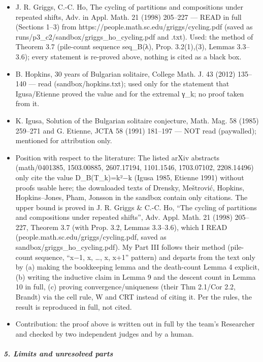\documentclass[11pt,a4paper]{article}
\providecommand{\tightlist}{\setlength{\itemsep}{0pt}\setlength{\parskip}{0pt}}
\begin{document}
\begin{itemize}
\tightlist
\item
  J. R. Griggs, C.-C. Ho, The cycling of partitions and compositions
  under repeated shifts, Adv. in Appl. Math. 21 (1998) 205--227 --- READ
  in full (Sections 1--3) from
  https://people.math.sc.edu/griggs/cycling.pdf (saved as
  runs/p3\_c2/sandbox/griggs\_ho\_cycling.pdf and .txt). Used: the
  method of Theorem 3.7 (pile-count sequence seq\_B(λ), Prop.
  3.2(1),(3), Lemmas 3.3--3.6); every statement is re-proved above,
  nothing is cited as a black box.
\item
  B. Hopkins, 30 years of Bulgarian solitaire, College Math. J. 43
  (2012) 135--140 --- read (sandbox/hopkins.txt); used only for the
  statement that Igusa/Etienne proved the value and for the extremal
  γ\_k; no proof taken from it.
\item
  K. Igusa, Solution of the Bulgarian solitaire conjecture, Math. Mag.
  58 (1985) 259--271 and G. Etienne, JCTA 58 (1991) 181--197 --- NOT
  read (paywalled); mentioned for attribution only.
\item
  Position with respect to the literature: The listed arXiv abstracts
  (math/0401385, 1503.00885, 2607.17194, 1101.1546, 1703.07102,
  2208.14496) only cite the value D\_B(T\_k)=k²−k (Igusa 1985, Etienne
  1991) without proofs usable here; the downloaded texts of Drensky,
  Meštrović, Hopkins, Hopkins--Jones, Pham, Jonsson in the sandbox
  contain only citations. The upper bound is proved in J. R. Griggs \&
  C.-C. Ho, ``The cycling of partitions and compositions under repeated
  shifts'', Adv. Appl. Math. 21 (1998) 205--227, Theorem 3.7 (with Prop.
  3.2, Lemmas 3.3--3.6), which I READ
  (people.math.sc.edu/griggs/cycling.pdf, saved as
  sandbox/griggs\_ho\_cycling.pdf). My Part III follows their method
  (pile-count sequence, ``x−1, x, \ldots, x, x+1'' pattern) and departs
  from the text only by (a) making the bookkeeping lemma and the
  death-count Lemma 4 explicit, (b) writing the inductive claim in Lemma
  9 and the descent count in Lemma 10 in full, (c) proving
  convergence/uniqueness (their Thm 2.1/Cor 2.2, Brandt) via the cell
  rule, W and CRT instead of citing it. Per the rules, the result is
  reproduced in full, not cited.
\item
  Contribution: the proof above is written out in full by the team's
  Researcher and checked by two independent judges and by a human.
\end{itemize}

\subparagraph{5. Limits and unresolved
parts}\label{limits-and-unresolved-parts}
\end{document}
